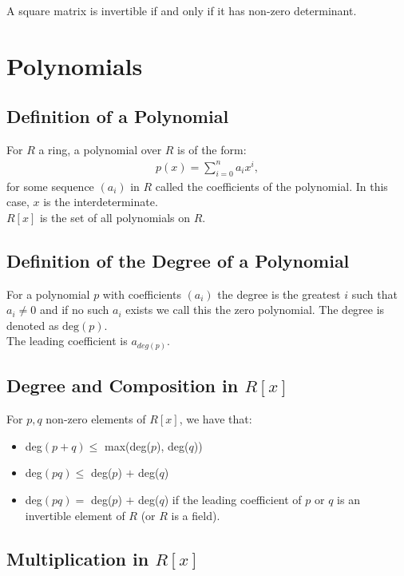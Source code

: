 \documentclass[a4paper, 12pt, twoside]{article}
\begin{document}
A square matrix is invertible if and only if it has non-zero determinant.

\section{Polynomials}

\subsection{Definition of a Polynomial}

For $R$ a ring, a polynomial over $R$ is of the form: \begin{gather*}
  p(x) = \sum_{i = 0}^n a_ix^i,
\end{gather*} for some sequence $(a_i)$ in $R$ called the coefficients
of the polynomial. In this case, $x$ is the interdeterminate.
\\[\baselineskip]
$R[x]$ is the set of all polynomials on $R$. 

\subsection{Definition of the Degree of a Polynomial}

For a polynomial $p$ with coefficients $(a_i)$ the degree is the greatest 
$i$ such that $a_i \neq 0$ and if no such $a_i$ exists we call this 
the zero polynomial. The degree is denoted as $\text{deg}(p)$.
\\[\baselineskip]
The leading coefficient is $a_{deg(p)}$.

\subsection{Degree and Composition in $R[x]$}

For $p, q$ non-zero elements of $R[x]$, we have that: \begin{itemize}
  \item deg$(p + q) \leq $ max(deg($p$), deg($q$)) 
  \item deg$(pq) \leq $ deg($p$) $+$ deg($q$) 
  \item deg$(pq) = $ deg($p$) $+$ deg($q$) if the leading coefficient of
  $p$ or $q$ is an invertible element of $R$ (or $R$ is a field).
\end{itemize}

\subsection{Multiplication in $R[x]$}
\end{document}
